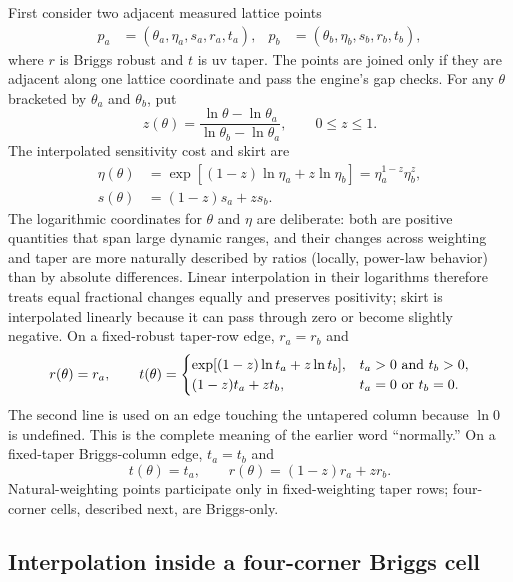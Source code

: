 \documentclass[11pt]{article}
\begin{document}
First consider two adjacent measured lattice points
\begin{align*}
 p_a&=(\theta_a,\eta_a,s_a,r_a,t_a),&
 p_b&=(\theta_b,\eta_b,s_b,r_b,t_b),
\end{align*}
where $r$ is Briggs robust and $t$ is uv taper.  The points are joined only if
they are adjacent along one lattice coordinate and pass the engine's gap
checks.  For any $\theta$ bracketed by $\theta_a$ and $\theta_b$, put
\begin{equation}
 z(\theta)=
 \frac{\ln\theta-\ln\theta_a}{\ln\theta_b-\ln\theta_a},
 \qquad 0\le z\le1.
 \label{eq:edge-fraction}
\end{equation}
The interpolated sensitivity cost and skirt are
\begin{align}
 \eta(\theta)&=\exp\!\left[(1-z)\ln\eta_a+z\ln\eta_b\right]
               =\eta_a^{1-z}\eta_b^z,\label{eq:edge-eta}\\
 s(\theta)&=(1-z)s_a+zs_b.\label{eq:edge-skirt}
\end{align}
The logarithmic coordinates for $\theta$ and $\eta$ are deliberate: both are
positive quantities that span large dynamic ranges, and their changes across
weighting and taper are more naturally described by ratios (locally,
power-law behavior) than by absolute differences.  Linear interpolation in
their logarithms therefore treats equal fractional changes equally and
preserves positivity; skirt is interpolated linearly because it can pass
through zero or become slightly negative.
On a fixed-robust taper-row edge, $r_a=r_b$ and
\begin{equation}
 r(\theta)=r_a,\qquad
 t(\theta)=
 \begin{cases}
  \exp[(1-z)\ln t_a+z\ln t_b],&t_a>0\ \hbox{and}\ t_b>0,\\
  (1-z)t_a+zt_b,&t_a=0\ \hbox{or}\ t_b=0.
 \end{cases}
 \label{eq:edge-row-parameters}
\end{equation}
The second line is used on an edge touching the untapered column because
$\ln0$ is undefined.  This is the complete meaning of the earlier word
``normally.''  On a fixed-taper Briggs-column edge, $t_a=t_b$ and
\begin{equation}
 t(\theta)=t_a,\qquad r(\theta)=(1-z)r_a+zr_b.
 \label{eq:edge-column-parameters}
\end{equation}
Natural-weighting points participate only in fixed-weighting taper rows;
four-corner cells, described next, are Briggs-only.

\subsection{Interpolation inside a four-corner Briggs cell}
\end{document}
